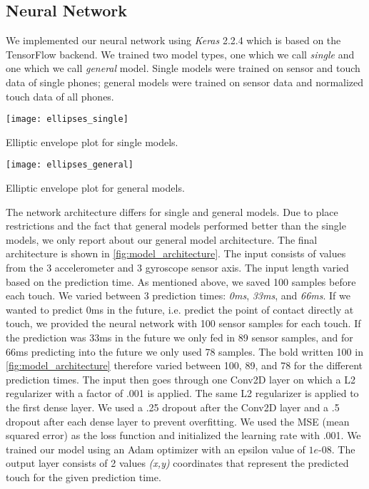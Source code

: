 \subsection{Neural Network}

We implemented our neural network using \textit{Keras} 2.2.4 which is based on the TensorFlow backend.
We trained two model types, one which we call \textit{single} and one which we call \textit{general} model.
Single models were trained on sensor and touch data of single phones; general models were trained on sensor data and normalized touch data of all phones.
\begin{marginfigure}	
	\centering
	\texttt{[image: ellipses\_single]}
	\caption{Elliptic envelope plot for single models.\newline}
	\label{fig:ell_single}
\end{marginfigure}
\begin{marginfigure}
	\texttt{[image: ellipses\_general]}
	\caption{Elliptic envelope plot for general models.}
	\label{fig:ell_general}
\end{marginfigure}
The network architecture differs for single and general models.
Due to place restrictions and the fact that general models performed better than the single models, we only report about our general model architecture.
The final architecture is shown in \cref{fig:model_architecture}.
The input consists of values from the 3 accelerometer and 3 gyroscope sensor axis.
The input length varied based on the prediction time.
As mentioned above, we saved 100 samples before each touch.
We varied between 3 prediction times: \textit{0ms}, \textit{33ms}, and \textit{66ms}.
If we wanted to predict 0ms in the future, i.e. predict the point of contact directly at touch, we provided the neural network with 100 sensor samples for each touch.
If the prediction was 33ms in the future we only fed in 89 sensor samples, and for 66ms predicting into the future we only used 78 samples.
The bold written 100 in \cref{fig:model_architecture} therefore varied between 100, 89, and 78 for the different prediction times.
The input then goes through one Conv2D layer on which a L2 regularizer with a factor of .001 is applied.
The same L2 regularizer is applied to the first dense layer.
We used a .25 dropout after the Conv2D layer and a .5 dropout after each dense layer to prevent overfitting.
We used the MSE (mean squared error) as the loss function and initialized the learning rate with .001.
We trained our model using an Adam optimizer with an epsilon value of $ 1e$-08.
The output layer consists of 2 values \textit{(x,y)} coordinates that represent the predicted touch for the given prediction time.


